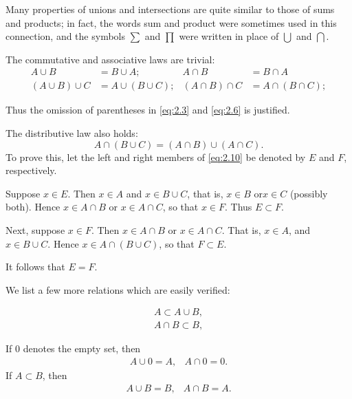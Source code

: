 \begin{myRemark}
    Many properties of unions and intersections are quite similar to those of sums and products; in fact, the words sum and product were sometimes used in this connection, and the symbols $\sum$ and $\prod$ were written in place of $\bigcup$ and $\bigcap$.
\end{myRemark}

The commutative and associative laws are trivial:
\begin{align}
        A \cup B &= B \cup A; &
        A \cap B &= B \cap A \label{eq:2.8} \\
        \left(A \cup B\right) \cup C &= A \cup \left(B \cup C\right); &
        \left(A \cap B\right) \cap C &= A \cap \left(B \cap C\right);\label{eq:2.9}
\end{align}

Thus the omission of parentheses in \ref{eq:2.3} and \ref{eq:2.6} is justified.

The distributive law also holds:
\begin{equation}
    \label{eq:2.10}
    A \cap \left( B \cup C\right) = 
    \left(A \cap B\right) \cup \left(A \cap C\right).
\end{equation}
To prove this, let the left and right members of \ref{eq:2.10} be denoted by $E$ and $F$, respectively.

Suppose $x \in E$. Then $x \in A$ and $x \in B \cup C$, that is, $x \in B$ or$ x \in C$ (possibly both). Hence $x \in A\cap B$ or $x \in A\cap C$, so that $x \in F$. Thus $E \subset F$.

Next, suppose $x \in F$. Then $x \in A\cap B$ or $x \in A\cap C$. That is, $x \in A$, and $x \in B\cup C$. Hence $x \in A\cap \left(B \cup C\right)$, so that $F \subset E$.

It follows that $E = F$.

We list a few more relations which are easily verified:

\begin{align}
    A \subset A \cup B, \label{eq:2.11}\\
    A \cap B \subset B, \label{eq:2.12}
\end{align}

If $0$ denotes the empty set, then
\begin{equation}
    \begin{array}{cc}
        A \cup 0 = A, & A \cap 0 = 0.
    \end{array}
\end{equation}
If $A \subset B$, then
\begin{equation}
    \begin{array}{cc}
        A \cup B = B, & A \cap B = A.
    \end{array}
\end{equation}

